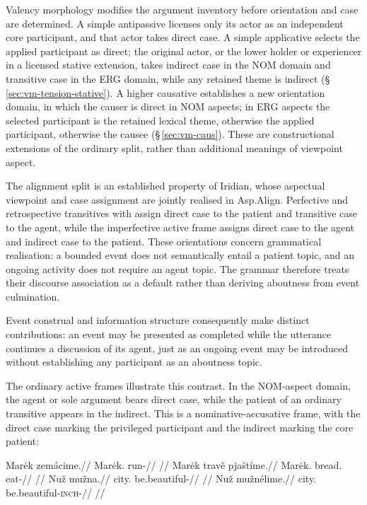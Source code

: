 Valency morphology modifies the argument inventory before orientation and case
are determined. A simple antipassive licenses only its actor as an independent
core participant, and that actor takes direct case. A simple applicative
selects the applied participant as direct; the original actor, or the lower
holder or experiencer in a licensed stative extension, takes indirect case in
the NOM domain and transitive case in the ERG domain, while any retained theme
is indirect (§\,\ref{sec:vm-tension-stative}). A higher causative establishes a new orientation domain, in which the
causer is direct in NOM aspects; in ERG aspects the selected participant is the
retained lexical theme, otherwise the applied participant, otherwise the
causee (§\,\ref{sec:vm-caus}). These are constructional extensions of the
ordinary split, rather than additional meanings of viewpoint aspect.

The alignment split is an established property of Iridian, whose aspectual
 viewpoint and case assignment are jointly realised in Asp.Align. Perfective
 and retrospective transitives with  assign direct case to the patient
 and transitive case to the agent, while the imperfective active frame assigns
 direct case to the agent and indirect case to the patient.
 These orientations concern grammatical realisation: a bounded event does not
 semantically entail a patient topic, and an ongoing activity does not require
 an agent topic. The grammar therefore treats their discourse association as
 a default rather than deriving aboutness from event culmination.

Event construal and information structure consequently make distinct
 contributions: an event may be presented as completed while the utterance
 continues a discussion of its agent, just as an ongoing event may be
 introduced without establishing any participant as an aboutness topic.

The ordinary active frames illustrate this contrast.
In the NOM-aspect domain, the agent or sole argument bears direct case,
while the patient of an ordinary transitive appears in
the indirect. This is a nominative-accusative frame, with the direct case
marking the privileged participant and the indirect marking the core patient:

\pex
\a
\begingl
\gla Marėk zemácime.//
\glb Marėk.\Dir{} run-\Prog{}//
\glft {} //
\endgl
\a
\begingl
\gla Marėk travě pjaštíme.//
\glb Marėk.\Dir{} bread.\Ind{} eat-\Prog{}//
\glft {} //
\endgl
\a
\begingl
\gla Nuž mužna.//
\glb city.\Dir{} be.beautiful-\Cont{}//
\glft {} //
\endgl
\a
\begingl
\gla Nuž mužnélime.//
\glb city.\Dir{} be.beautiful-\textsc{inch}-\Prog{}//
\glft {} //
\endgl
\xe

